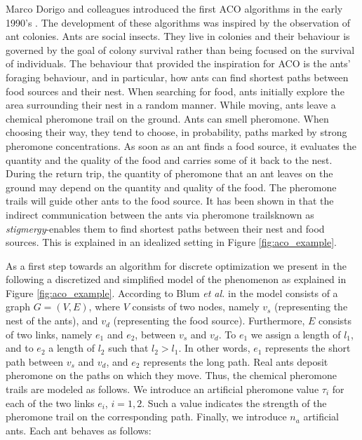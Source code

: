 Marco Dorigo and colleagues introduced the first ACO algorithms in the early 1990's \cite{dorigo1992optimization,dorigo1991positive,dorigo1996ant}. The development of these algorithms was inspired by the observation of ant colonies. Ants are social insects. They live in colonies and their behaviour is governed by the goal of colony survival rather than being focused on the survival of individuals. The behaviour that provided the inspiration for ACO is the ants' foraging behaviour, and in particular, how ants can find shortest paths between food sources and their nest. When searching for food, ants initially explore the area surrounding their nest in a random manner. While moving, ants leave a chemical pheromone trail on the ground. Ants can smell pheromone. When choosing their way, they tend to choose, in probability, paths marked by strong pheromone concentrations. As soon as an ant finds a food source, it evaluates the quantity and the quality of the food and carries some of it back to the nest. During the return trip, the quantity of pheromone that an ant leaves on the ground may depend on the quantity and quality of the food. The pheromone trails will guide other ants to the food source. It has been shown in \cite{deneubourg1990self} that the indirect communication between the ants via pheromone trails\textendash known as \textit{stigmergy}-enables them to find shortest paths between their nest and food sources. This is explained in an idealized setting in Figure \ref{fig:aco_example}.

As a first step towards an algorithm for discrete optimization we present in the following a discretized and simplified model of the phenomenon as explained in Figure \ref{fig:aco_example}. According to Blum \textit{et al.} in \cite{blum2005ant} the model consists of a graph $G = (V ,E)$, where $V$ consists of two nodes, namely $v_s$ (representing the nest of the ants), and $v_d$ (representing the food source). Furthermore, $E$ consists of two links, namely $e_1$ and $e_2$, between $v_s$ and $v_d$. To $e_1$ we assign a length of $l_1$, and to $e_2$ a length of $l_2$ such that $l_2 > l_1$. In other words, $e_1$ represents the short path between $v_s$ and $v_d$, and $e_2$ represents the long path. Real ants deposit pheromone on the paths on which they move. Thus, the chemical pheromone trails are modeled as follows. We introduce an artificial pheromone value ${\tau}_i$  for each of the two links $e_i$, $i = 1, 2$. Such a value indicates the strength of the pheromone trail on the corresponding path. Finally, we introduce $n_a$ artificial ants. Each ant behaves as follows:

